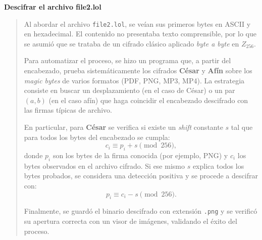 \textbf{Descifrar el archivo file2.lol}
\begin{quote}
    Al abordar el archivo \texttt{file2.lol}, se veían sus primeros bytes
    en ASCII y en hexadecimal. El contenido no presentaba texto comprensible, por lo que se
    asumió que se trataba de un cifrado clásico aplicado \emph{byte a byte} en $Z_{256}$.

    Para automatizar el proceso, se hizo un programa que, a partir del encabezado,
    prueba sistemáticamente los cifrados \textbf{César} y \textbf{Afín} sobre los \emph{magic bytes}
    de varios formatos (PDF, PNG, MP3, MP4). La estrategia consiste en buscar un
    desplazamiento (en el caso de César) o un par $(a,b)$ (en el caso afín) que haga
    coincidir el encabezado descifrado con las firmas típicas de archivo.

    En particular, para \textbf{César} se verifica si existe un \emph{shift} constante $s$ tal que
    para todos los bytes del encabezado se cumpla:
    \[
      c_i \equiv p_i + s \pmod{256},
    \]
    donde $p_i$ son los bytes de la firma conocida (por ejemplo, PNG) y $c_i$ los bytes
    observados en el archivo cifrado. Si ese mismo $s$ explica todos los bytes probados,
    se considera una detección positiva y se procede a descifrar con:
    \[
      p_i \equiv c_i - s \pmod{256}.
    \]


    
    Finalmente, se guardó el binario descifrado con extensión \texttt{.png} y se verificó su
    apertura correcta con un visor de imágenes, validando el éxito del proceso.
\end{quote}
\vspace{.5cm}